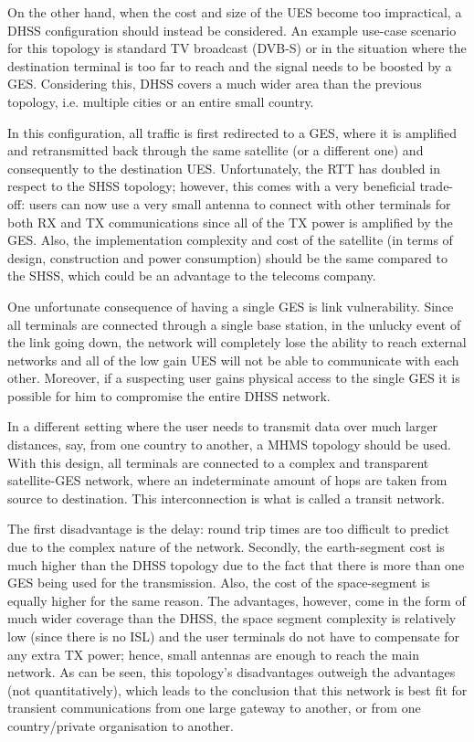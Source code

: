 On the other hand, when the cost and size of the UES become too impractical, a DHSS configuration should instead be considered. An example use-case scenario for this topology is standard TV broadcast (DVB-S) or in the situation where the destination terminal is too far to reach and the signal needs to be boosted by a GES\autocite{book1_pp87}. Considering this, DHSS covers a much wider area than the previous topology, i.e. multiple cities or an entire small country.

In this configuration, all traffic is first redirected to a GES, where it is amplified and retransmitted back through the same satellite (or a different one\autocite{book1_pp86}) and consequently to the destination UES. Unfortunately, the RTT has doubled in respect to the SHSS topology; however, this comes with a very beneficial trade-off: users can now use a very small antenna to connect with other terminals for both RX and TX communications since all of the TX power is amplified by the GES. Also, the implementation complexity and cost of the satellite (in terms of design, construction and power consumption) should be the same compared to the SHSS, which could be an advantage to the telecoms company.

One unfortunate consequence of having a single GES is link vulnerability. Since all terminals are connected through a single base station, in the unlucky event of the link going down, the network will completely lose the ability to reach external networks and all of the low gain UES will not be able to communicate with each other. Moreover, if a suspecting user gains physical access to the single GES it is possible for him to compromise the entire DHSS network.

\newpage
In a different setting where the user needs to transmit data over much larger distances, say, from one country to another, a MHMS topology should be used. With this design, all terminals are connected to a complex and transparent satellite-GES network, where an indeterminate amount of hops are taken from source to destination. This interconnection is what is called a transit network.

The first disadvantage is the delay: round trip times are too difficult to predict due to the complex nature of the network. Secondly, the earth-segment cost is much higher than the DHSS topology due to the fact that there is more than one GES being used for the transmission. Also, the cost of the space-segment is equally higher for the same reason. The advantages, however, come in the form of much wider coverage than the DHSS, the space segment complexity is relatively low (since there is no ISL) and the user terminals do not have to compensate for any extra TX power; hence, small antennas are enough to reach the main network. As can be seen, this topology's disadvantages outweigh the advantages (not quantitatively), which leads to the conclusion that this network is best fit for transient communications from one large gateway to another, or from one country/private organisation to another.\\


